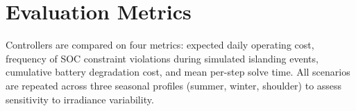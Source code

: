 \section{Evaluation Metrics}

Controllers are compared on four metrics: expected daily operating cost, frequency of SOC constraint violations during simulated islanding events, cumulative battery degradation cost, and mean per-step solve time. All scenarios are repeated across three seasonal profiles (summer, winter, shoulder) to assess sensitivity to irradiance variability.

